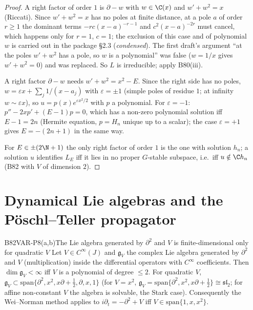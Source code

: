 \begin{proof}
A right factor of order $1$ is $\partial-w$ with $w\in\C(x)$ and $w'+w^2=x$ (Riccati). Since $w'+w^2=x$ has no poles at finite distance, at a pole $a$ of order $r\ge1$ the dominant terms $-rc(x-a)^{-r-1}$ and $c^2(x-a)^{-2r}$ must cancel, which happens only for $r=1$, $c=1$; the exclusion of this case and of polynomial $w$ is carried out in the package \S2.3 (\emph{condensed}). The first draft's argument ``at the poles $w'+w^2$ has a pole, so $w$ is a polynomial'' was false ($w=1/x$ gives $w'+w^2=0$) and was replaced. So $L$ is irreducible; apply B80(iii).

A right factor $\partial-w$ needs $w'+w^2=x^2-E$. Since the right side has no poles, $w=\varepsilon x+\sum_j1/(x-a_j)$ with $\varepsilon=\pm1$ (simple poles of residue $1$; at infinity $w\sim\varepsilon x$), so $u=p(x)e^{\varepsilon x^2/2}$ with $p$ a polynomial. For $\varepsilon=-1$: $p''-2xp'+(E-1)p=0$, which has a non-zero polynomial solution iff $E-1=2n$ (Hermite equation, $p=H_n$ unique up to a scalar); the case $\varepsilon=+1$ gives $E=-(2n+1)$ in the same way.

For $E\in\pm(2\N+1)$ the only right factor of order $1$ is the one with solution $h_n$; a solution $u$ identifies $L_E$ iff it lies in no proper $G$-stable subspace, i.e.\ iff $u\notin\C h_n$ (B82 with $V$ of dimension $2$).

\end{proof}

\section{Dynamical Lie algebras and the P\"oschl--Teller propagator}

\begin{dimcard}{B82}{VAR-P8(a,b)}{The Lie algebra generated by $\partial^2$ and $V$ is finite-dimensional only for quadratic $V$}{\pw}{}
Let $V\in C^\infty(J)$ and $\mathfrak g_V$ the complex Lie algebra generated by $\partial^2$ and $V$ (multiplication) inside the differential operators with $C^\infty$ coefficients. Then $\dim\mathfrak g_V<\infty$ iff $V$ is a polynomial of degree $\le2$. For quadratic $V$, $\mathfrak g_V\subset\mathrm{span}\{\partial^2,x^2,x\partial+\tfrac12,\partial,x,1\}$ (for $V=x^2$, $\mathfrak g_V=\mathrm{span}\{\partial^2,x^2,x\partial+\tfrac12\}\cong\mathfrak{sl}_2$; for affine non-constant $V$ the algebra is solvable, the Stark case). Consequently the Wei--Norman method applies to $i\partial_t=-\partial^2+V$ iff $V\in\mathrm{span}\{1,x,x^2\}$.
\end{dimcard}

